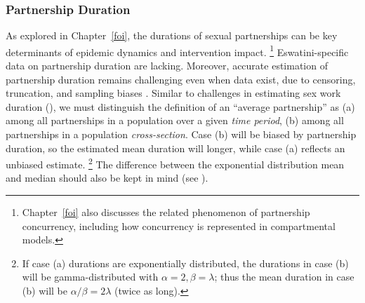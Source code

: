 \subsubsection{Partnership Duration}\label{model.par.sex.dur}
As explored in Chapter~\ref{foi}, the durations of sexual partnerships
can be key determinants of epidemic dynamics and intervention impact.%
\footnote{Chapter~\ref{foi} also discusses the related phenomenon of partnership concurrency,
  including how concurrency is represented in compartmental models.}
Eswatini-specific data on partnership duration are lacking.
Moreover, accurate estimation of partnership duration remains challenging even when data exist,
due to censoring, truncation, and sampling biases \cite{Burington2010}.
Similar to challenges in estimating sex work duration (),
we must distinguish the definition of an ``average partnership'' as
(a) among all partnerships in a population over a given \emph{time period}, \vs
(b) among all partnerships in a population \emph{cross-section}.
Case (b) will be biased by partnership duration,
so the estimated mean duration will longer,
while case (a) reflects an unbiased estimate.%
\footnote{If case (a) durations are exponentially distributed,
  the durations in case (b) will be gamma-distributed with $\alpha = 2, \beta = \lambda$;
  thus the mean duration in case (b) will be $\alpha/\beta = 2\lambda$ (twice as long).}
The difference between the exponential distribution mean and median
should also be kept in mind (see ).
